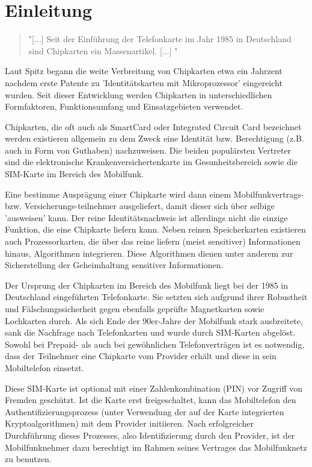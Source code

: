 \section{Einleitung}
\label{einleitung}
\begin{quote}
"[...] Seit der Einführung der Telefonkarte im Jahr 1985 in Deutschland sind Chipkarten ein
Massenartikel. [...] "\cite{spitz11}
\end{quote}

Laut Spitz begann die weite Verbreitung von Chipkarten etwa ein Jahrzent nachdem erste Patente
zu 'Identitätskarten mit Mikroprozessor' eingereicht wurden. Seit dieser Entwicklung
werden Chipkarten in unterschiedlichen Formfaktoren, Funktionsumfang und Einsatzgebieten
verwendet.

Chipkarten, die oft auch als SmartCard oder Integrated Circuit Card bezeichnet werden existieren
allgemein zu dem Zweck eine Identität bzw. Berechtigung (z.B. auch in Form von Guthaben) nachzuweisen.
Die beiden populärsten Vertreter sind die elektronische Krankenversichertenkarte im Gesunheitsbereich
sowie die \ac{SIM}-Karte im Bereich des Mobilfunk.

Eine bestimme Ausprägung einer Chipkarte wird dann einem Mobilfunkvertrags- bzw. Versicherungs-teilnehmer
ausgeliefert, damit dieser sich über selbige 'ausweisen' kann. Der reine Identitätsnachweis ist
allerdings nicht die einzige Funktion, die eine Chipkarte liefern kann. Neben reinen Speicherkarten
existieren auch Prozessorkarten, die über das reine liefern (meist sensitiver) Informationen hinaus,
Algorithmen integrieren. Diese Algorithmen dienen unter anderem zur Sicherstellung der Geheimhaltung
sensitiver Informationen.

Der Ursprung der Chipkarten im Bereich des Mobilfunk liegt bei der 1985 in Deutschland eingeführten
Telefonkarte. Sie setzten sich aufgrund ihrer Robustheit und Fälschungssicherheit gegen ebenfalls
geprüfte Magnetkarten sowie Lochkarten durch. Als sich Ende der 90er-Jahre der Mobilfunk stark
ausbreitete, sank die Nachfrage nach Telefonkarten und wurde durch \ac{SIM}-Karten abgelöst.
Sowohl bei Prepaid- als auch bei gewöhnlichen Telefonverträgen ist es notwendig, dass der Teilnehmer
eine Chipkarte vom Provider erhält und diese in sein Mobiltelefon einsetzt.

Diese \ac{SIM}-Karte ist optional mit einer Zahlenkombination (\ac{PIN}) vor Zugriff von Fremden geschützt.
Ist die Karte erst freigeschaltet, kann das Mobiltelefon den Authentifizierungsprozess (unter Verwendung der
auf der Karte integrierten Kryptoalgorithmen) mit dem Provider initiieren. Nach erfolgreicher Durchführung
dieses Prozesses, also Identifizierung durch den Provider, ist der Mobilfunknehmer dazu berechtigt
im Rahmen seines Vertrages das Mobilfunknetz zu benutzen.

